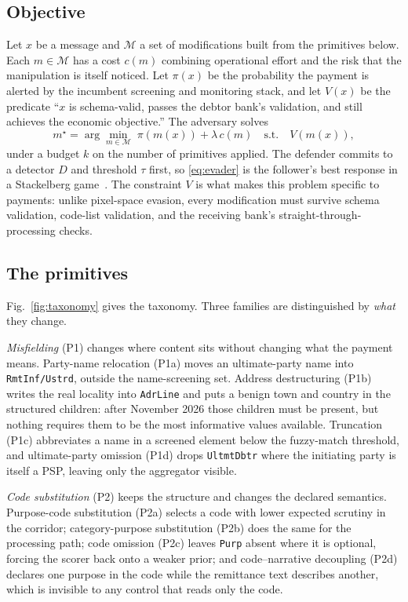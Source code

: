 \documentclass[conference]{IEEEtran}
\begin{document}
\subsection{Objective}
Let $x$ be a message and $\mathcal{M}$ a set of modifications built from the
primitives below. Each $m \in \mathcal{M}$ has a cost $c(m)$ combining
operational effort and the risk that the manipulation is itself noticed. Let
$\pi(x)$ be the probability the payment is alerted by the incumbent screening
and monitoring stack, and let $V(x)$ be the predicate ``$x$ is schema-valid,
passes the debtor bank's validation, and still achieves the economic
objective.'' The adversary solves
\begin{equation}
m^\star = \arg\min_{m \in \mathcal{M}} \; \pi(m(x)) + \lambda\, c(m)
\quad \text{s.t.} \quad V(m(x)),
\label{eq:evader}
\end{equation}
under a budget $k$ on the number of primitives applied. The defender commits
to a detector $D$ and threshold $\tau$ first, so \eqref{eq:evader} is the
follower's best response in a Stackelberg game~\cite{bruckner2011}. The
constraint $V$ is what makes this problem specific to payments: unlike
pixel-space evasion, every modification must survive schema validation,
code-list validation, and the receiving bank's straight-through-processing
checks.

\subsection{The primitives}
Fig.~\ref{fig:taxonomy} gives the taxonomy. Three families are distinguished
by \emph{what} they change.

\emph{Misfielding} (P1) changes where content sits without changing what the
payment means. Party-name relocation (P1a) moves an ultimate-party name into
\texttt{RmtInf/Ustrd}, outside the name-screening set. Address destructuring
(P1b) writes the real locality into \texttt{AdrLine} and puts a benign town
and country in the structured children: after November 2026 those children
must be present, but nothing requires them to be the most informative values
available. Truncation (P1c) abbreviates a name in a screened element below
the fuzzy-match threshold, and ultimate-party omission (P1d) drops
\texttt{UltmtDbtr} where the initiating party is itself a PSP, leaving only
the aggregator visible.

\emph{Code substitution} (P2) keeps the structure and changes the declared
semantics. Purpose-code substitution (P2a) selects a code with lower expected
scrutiny in the corridor; category-purpose substitution (P2b) does the same
for the processing path; code omission (P2c) leaves \texttt{Purp} absent
where it is optional, forcing the scorer back onto a weaker prior; and
code--narrative decoupling (P2d) declares one purpose in the code while the
remittance text describes another, which is invisible to any control that
reads only the code.
\end{document}
